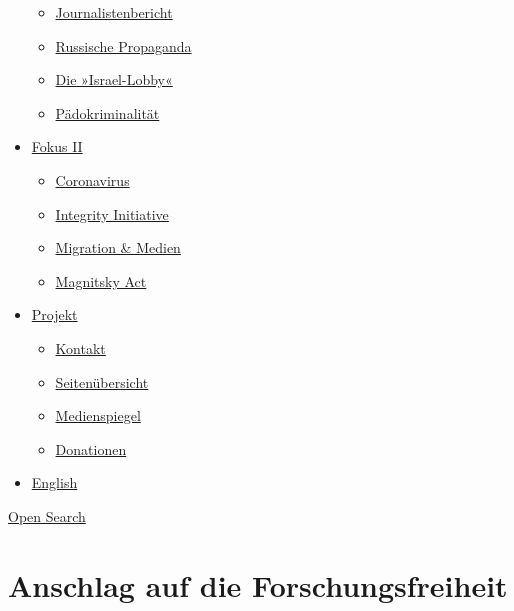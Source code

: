 \begin{itemize}
  \begin{itemize}
  \tightlist
  \item
    \href{https://swprs.org/bericht-eines-journalisten/}{Journalistenbericht}
  \item
    \href{https://swprs.org/russische-propaganda/}{Russische Propaganda}
  \item
    \href{https://swprs.org/die-israel-lobby-fakten-und-mythen/}{Die
    »Israel-Lobby«}
  \item
    \href{https://swprs.org/geopolitik-und-paedokriminalitaet/}{Pädokriminalität}
  \end{itemize}
\item
  \href{https://swprs.org/migration-und-medien/}{Fokus II}

  \begin{itemize}
  \tightlist
  \item
    \href{https://swprs.org/covid-19-hinweis-ii/}{Coronavirus}
  \item
    \href{https://swprs.org/die-integrity-initiative/}{Integrity
    Initiative}
  \item
    \href{https://swprs.org/migration-und-medien/}{Migration \& Medien}
  \item
    \href{https://swprs.org/der-fall-magnitsky/}{Magnitsky Act}
  \end{itemize}
\item
  \href{https://swprs.org/kontakt/}{Projekt}

  \begin{itemize}
  \tightlist
  \item
    \href{https://swprs.org/kontakt/}{Kontakt}
  \item
    \href{https://swprs.org/uebersicht/}{Seitenübersicht}
  \item
    \href{https://swprs.org/medienspiegel/}{Medienspiegel}
  \item
    \href{https://swprs.org/donationen/}{Donationen}
  \end{itemize}
\item
  \href{https://swprs.org/contact/}{English}
\end{itemize}

\protect\hyperlink{}{Open Search}

\hypertarget{anschlag-auf-die-forschungsfreiheit}{%
\section{Anschlag auf die
Forschungsfreiheit}\label{anschlag-auf-die-forschungsfreiheit}}

